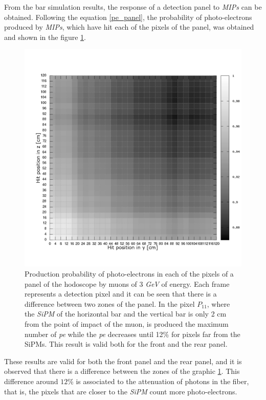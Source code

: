 \documentclass[submitting]{nst}
\begin{document}
From the bar simulation results, the response of a detection panel to \textsl{MIPs} can be obtained. Following the equation \ref{pe_panel}, the probability of photo-electrons produced by \textsl{MIPs}, which have hit each of the pixels of the panel, was obtained and shown in the figure \ref{atenuacion_panel_bw}.

\begin{figure}[h!]
    \centering
        \includegraphics[scale=0.3]{Figures/atenuacion_panel_bw.png}
   \caption[Response of the hodoscope panels]{Production probability of photo-electrons in each of the pixels of a panel of the hodoscope by muons of 3   \textsl{GeV}  of energy. Each frame represents a detection pixel and it can be seen that there is a difference between two zones of the panel. In the pixel $P_{11}$, where the \textsl{SiPM} of the horizontal bar and the vertical bar is only 2 cm from the point of impact of the muon, is produced the maximum number of \textsl{pe} while the \textsl{pe} decreases until 12\% for pixels far from the SiPMs. This result is valid both for the front and the rear panel.}\label{atenuacion_panel_bw}
\end{figure}


These results are valid for both the front panel and the rear panel, and it is observed that there is a difference between the zones of the graphic \ref{atenuacion_panel_bw}. This difference around $12$\% is associated to the attenuation of photons in the fiber, that is, the pixels that are closer to the \textsl{SiPM} count more photo-electrons. 
\end{document}
